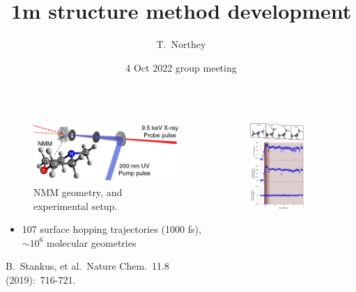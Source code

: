 \documentclass{beamer}
\title{1m structure method development}
\author{T.\ Northey}
\date{4 Oct 2022 group meeting}
\begin{document}
\begin{frame}[plain]
    \maketitle
\end{frame}

\begin{frame}
	\begin{columns} 
		\begin{column}{.4\textwidth}
			\begin{figure}[H]
				\centering
				\includegraphics[width=\textwidth]{nmm_geometry.png}
				\caption{NMM geometry, and experimental setup.}
				\label{fig:nmm-geom}
			\end{figure}
			\begin{itemize}
				\item 107 surface hopping trajectories (1000 fs), $\sim$$10^6$ molecular geometries 
			\end{itemize}
			{\tiny B.\ Stankus, et al.\ Nature Chem.\ 11.8 (2019):\ 716-721.}
		\end{column}
		\begin{column}{.6\textwidth}
			\begin{figure}[H]
				\centering
				\includegraphics[width=0.7\textwidth]{stankus_angle_plots.png}

\end{figure}
\end{column}
\end{columns}
\end{frame}
\end{document}
